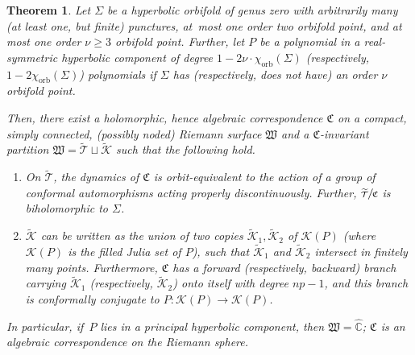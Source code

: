 \documentclass[JEP,XML,SOM,Unicode,NoFloatCountersInSection,published]{cedram}
\let\faktor\sfrac
\newtheorem{theorem}[lemma]{Theorem}
\theoremstyle{definition}
\theoremstyle{remark}
\newcommand{\C}{\mathbb{C}}
\newcommand{\cT}{\mathcal{T}}
\newcommand{\cK}{\mathcal{K}}
\begin{document}
\begin{theorem}\label{corr_main_thm}
Let $\Sigma$ be a hyperbolic orbifold of genus zero with arbitrarily many (at least one, but finite) punctures, at~most one order two orbifold point, and at most one order $\nu\geq 3$ orbifold point.
Further, let $P$ be a polynomial in a real-symmetric hyperbolic component of degree $1-2\nu\cdot\chi_{\mathrm{orb}}(\Sigma)$ (respectively, $1-2\chi_{\mathrm{orb}}(\Sigma)$) polynomials if $\Sigma$ has (respectively, does not have) an order $\nu$ orbifold point.

Then, there exist a holomorphic, hence algebraic correspondence $\mathfrak{C}$ on a compact, simply connected, (possibly noded) Riemann surface $\mathfrak{W}$ and a $\mathfrak{C}$-invariant partition $\mathfrak{W}=\widetilde{\cT}\sqcup\widetilde{\cK}$ such that the following hold.
\begin{enumerate}
\item On $\widetilde{\cT}$, the dynamics of $\mathfrak{C}$ is orbit-equivalent to the action of a group of conformal automorphisms acting properly discontinuously. Further, $\faktor{\widetilde{\cT}}{\mathfrak{C}}$ is biholomorphic to $\Sigma$.

\item $\widetilde{\cK}$ can be written as the union of two copies $\widetilde{\cK}_1, \widetilde{\cK}_2$ of $\cK(P)$ (where $\cK(P)$ is the filled Julia set of $P$), such that $\widetilde{\cK}_1$ and $\widetilde{\cK}_2$ intersect in finitely many points. Furthermore, $\mathfrak{C}$ has a forward (respectively, backward) branch carrying $\widetilde{\cK}_1$ (respectively, $\widetilde{\cK}_2$) onto itself with degree $np-1$, and this branch is conformally conjugate to $P:\mathcal{K}(P)\to \mathcal{K}(P)$.
\end{enumerate}
In particular, if~$P$ lies in a principal hyperbolic component, then $\mathfrak{W}=\widehat{\C}$; \ie $\mathfrak{C}$ is an algebraic correspondence on the Riemann sphere.
\end{theorem}
\end{document}
